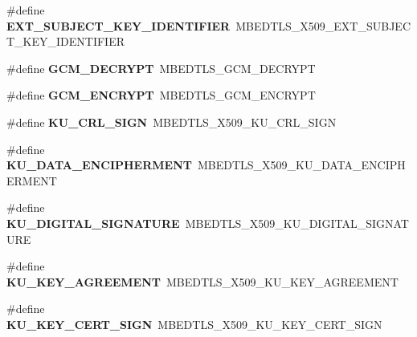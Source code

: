\begin{DoxyCompactItemize}
\item 
\mbox{\label{compat-1_83_8h_af918b482ca119bfc67935caa07d3e248}} 
\#define {\bfseries E\+X\+T\+\_\+\+S\+U\+B\+J\+E\+C\+T\+\_\+\+K\+E\+Y\+\_\+\+I\+D\+E\+N\+T\+I\+F\+I\+ER}~M\+B\+E\+D\+T\+L\+S\+\_\+\+X509\+\_\+\+E\+X\+T\+\_\+\+S\+U\+B\+J\+E\+C\+T\+\_\+\+K\+E\+Y\+\_\+\+I\+D\+E\+N\+T\+I\+F\+I\+ER
\item 
\mbox{\label{compat-1_83_8h_a65cecb8f0fb02b51814bfbbae65fdd9c}} 
\#define {\bfseries G\+C\+M\+\_\+\+D\+E\+C\+R\+Y\+PT}~M\+B\+E\+D\+T\+L\+S\+\_\+\+G\+C\+M\+\_\+\+D\+E\+C\+R\+Y\+PT
\item 
\mbox{\label{compat-1_83_8h_a9ec162612f0f3a8b7e380c02ffc35867}} 
\#define {\bfseries G\+C\+M\+\_\+\+E\+N\+C\+R\+Y\+PT}~M\+B\+E\+D\+T\+L\+S\+\_\+\+G\+C\+M\+\_\+\+E\+N\+C\+R\+Y\+PT
\item 
\mbox{\label{compat-1_83_8h_a14185258174d3ae78dbccd55de36b0a8}} 
\#define {\bfseries K\+U\+\_\+\+C\+R\+L\+\_\+\+S\+I\+GN}~M\+B\+E\+D\+T\+L\+S\+\_\+\+X509\+\_\+\+K\+U\+\_\+\+C\+R\+L\+\_\+\+S\+I\+GN
\item 
\mbox{\label{compat-1_83_8h_a5d7af2d0048312e611b8af54eabd064a}} 
\#define {\bfseries K\+U\+\_\+\+D\+A\+T\+A\+\_\+\+E\+N\+C\+I\+P\+H\+E\+R\+M\+E\+NT}~M\+B\+E\+D\+T\+L\+S\+\_\+\+X509\+\_\+\+K\+U\+\_\+\+D\+A\+T\+A\+\_\+\+E\+N\+C\+I\+P\+H\+E\+R\+M\+E\+NT
\item 
\mbox{\label{compat-1_83_8h_a34abc95bf0fa471e18d1dd3b295492f6}} 
\#define {\bfseries K\+U\+\_\+\+D\+I\+G\+I\+T\+A\+L\+\_\+\+S\+I\+G\+N\+A\+T\+U\+RE}~M\+B\+E\+D\+T\+L\+S\+\_\+\+X509\+\_\+\+K\+U\+\_\+\+D\+I\+G\+I\+T\+A\+L\+\_\+\+S\+I\+G\+N\+A\+T\+U\+RE
\item 
\mbox{\label{compat-1_83_8h_a349ec0e59749ed5ca9ac9e030c06049f}} 
\#define {\bfseries K\+U\+\_\+\+K\+E\+Y\+\_\+\+A\+G\+R\+E\+E\+M\+E\+NT}~M\+B\+E\+D\+T\+L\+S\+\_\+\+X509\+\_\+\+K\+U\+\_\+\+K\+E\+Y\+\_\+\+A\+G\+R\+E\+E\+M\+E\+NT
\item 
\mbox{\label{compat-1_83_8h_a5da71e896dc465af98e4004ea40eb230}} 
\#define {\bfseries K\+U\+\_\+\+K\+E\+Y\+\_\+\+C\+E\+R\+T\+\_\+\+S\+I\+GN}~M\+B\+E\+D\+T\+L\+S\+\_\+\+X509\+\_\+\+K\+U\+\_\+\+K\+E\+Y\+\_\+\+C\+E\+R\+T\+\_\+\+S\+I\+GN

\end{DoxyCompactItemize}
